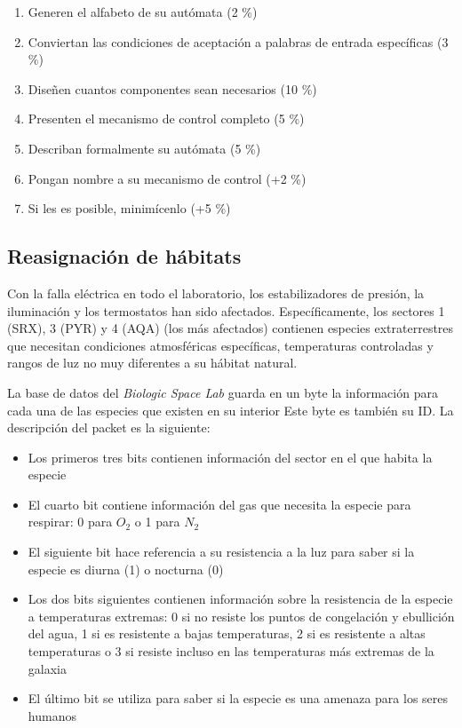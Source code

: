 \documentclass[8pt, onside]{article}
\begin{document}
\begin{enumerate}[label=\tt \alph*)]
    \itemsep0em
    \item Generen el alfabeto de su autómata (2 \%)
    \item Conviertan las condiciones de aceptación a palabras de entrada específicas (3 \%)
    \item Diseñen cuantos componentes sean necesarios (10 \%)
    \item Presenten el mecanismo de control completo (5 \%)
    \item Describan formalmente su autómata (5 \%)
    \item Pongan nombre a su mecanismo de control (+2 \%)
    \item Si les es posible, minimícenlo (+5 \%)
\end{enumerate}

\subsection*{Reasignación de hábitats}

Con la falla eléctrica en todo el laboratorio, los estabilizadores de presión, la iluminación y los termostatos han sido afectados. Específicamente, los sectores 1 (SRX), 3 (PYR) y 4 (AQA) (los más afectados) contienen especies extraterrestres que necesitan condiciones atmosféricas específicas, temperaturas controladas y rangos de luz no muy diferentes a su hábitat natural.

La base de datos del \textit{Biologic Space Lab} guarda en un byte la información para cada una de las especies que existen en su interior Este byte es también su ID.
La descripción del packet es la siguiente:

\begin{itemize}
    \itemsep0em
    \item Los primeros tres bits contienen información del sector en el que habita la especie
    \item El cuarto bit contiene información del gas que necesita la especie para respirar: 0 para ${O_2}$ o 1 para $N_2$
    \item El siguiente bit hace referencia a su resistencia a la luz para saber si la especie es diurna (1) o nocturna (0)
    \item Los dos bits siguientes contienen información sobre la resistencia de la especie a temperaturas extremas: 0 si no resiste los puntos de congelación y ebullición del agua, 1 si es resistente a bajas temperaturas, 2 si es resistente a altas temperaturas o 3 si resiste incluso en las temperaturas más extremas de la galaxia
    \item El último bit se utiliza para saber si la especie es una amenaza para los seres humanos
\end{itemize}
\end{document}
